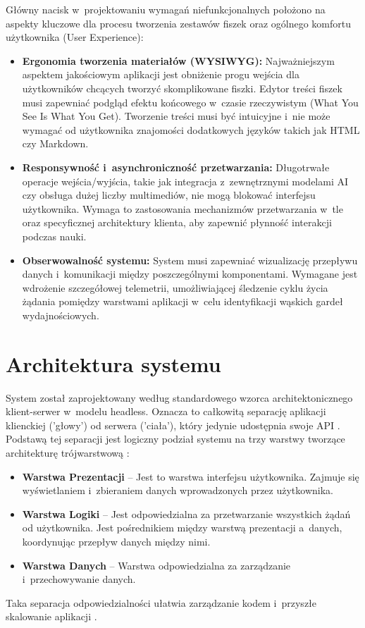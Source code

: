 Główny nacisk w~projektowaniu wymagań niefunkcjonalnych położono na aspekty kluczowe dla procesu tworzenia zestawów fiszek oraz 
ogólnego komfortu użytkownika (User Experience):
\begin{itemize}
    \item \textbf{Ergonomia tworzenia materiałów (WYSIWYG):} Najważniejszym aspektem jakościowym aplikacji jest obniżenie progu wejścia 
    dla użytkowników chcących tworzyć skomplikowane fiszki. Edytor treści fiszek musi zapewniać podgląd efektu końcowego w~czasie rzeczywistym
    (What You See Is What You Get). Tworzenie treści musi być intuicyjne i~nie może wymagać od użytkownika znajomości dodatkowych języków takich 
    jak HTML czy Markdown.
    \item \textbf{Responsywność i~asynchroniczność przetwarzania:} Długotrwałe operacje wejścia/wyjścia, takie jak integracja z~zewnętrznymi 
    modelami AI czy obsługa dużej liczby multimediów, nie mogą blokować interfejsu użytkownika. Wymaga to zastosowania mechanizmów przetwarzania 
    w~tle oraz specyficznej architektury klienta, aby zapewnić płynność interakcji podczas nauki.
    \item \textbf{Obserwowalność systemu:} System musi zapewniać wizualizację przepływu danych i~komunikacji między poszczególnymi komponentami. 
    Wymagane jest wdrożenie szczegółowej telemetrii, umożliwiającej śledzenie cyklu życia żądania pomiędzy warstwami aplikacji w~celu identyfikacji 
    wąskich gardeł wydajnościowych.
\end{itemize}

\section{Architektura systemu}

System został zaprojektowany według standardowego wzorca architektonicznego klient-serwer w~modelu headless. 
Oznacza to całkowitą separację aplikacji klienckiej ('głowy') od serwera ('ciała'), który jedynie udostępnia swoje API \cite{fowler2002}. 
Podstawą tej separacji jest logiczny podział systemu na trzy warstwy tworzące architekturę trójwarstwową \cite{sommerville2015}:
\begin{itemize}
    \item \textbf{Warstwa Prezentacji} -- Jest to warstwa interfejsu użytkownika. Zajmuje się wyświetlaniem i~zbieraniem danych wprowadzonych przez użytkownika.
    \item \textbf{Warstwa Logiki} -- Jest odpowiedzialna za przetwarzanie wszystkich żądań od użytkownika. Jest pośrednikiem między warstwą prezentacji a~danych, koordynując przepływ danych między nimi.
    \item \textbf{Warstwa Danych} -- Warstwa odpowiedzialna za zarządzanie i~przechowywanie danych. 
\end{itemize}
Taka separacja odpowiedzialności ułatwia zarządzanie kodem i~przyszłe skalowanie aplikacji \cite{cleancode}.

